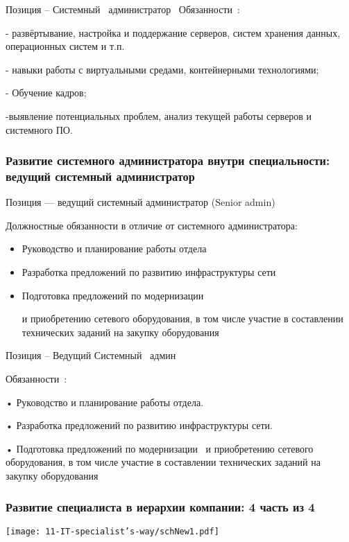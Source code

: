 \documentclass{../industrial-development}
\begin{document}
\lecturenotes

Позиция – Системный~\cite{hh} администратор~\cite{itcf}
Обязанности~\cite{rab}:

- развёртывание, настройка и поддержание серверов, систем хранения данных, операционных систем и т.п.

- навыки работы с виртуальными средами, контейнерными технологиями;

- Обучение кадров;

-выявление потенциальных проблем, анализ текущей работы серверов и системного ПО.

\begin{frame} \frametitle{Развитие системного администратора внутри специальности: ведущий системный администратор }
 \begin{block}{}
  \alert{Позиция --- ведущий системный администратор (Senior admin)}

Должностные обязанности в отличие от  системного администратора: 
  \end{block}
  \begin{itemize}
  \item   Руководство и планирование работы отдела
  \item  Разработка предложений по развитию инфраструктуры сети
  \item Подготовка предложений по модернизации 

и приобретению сетевого оборудования, в том числе участие в составлении технических заданий на закупку оборудования
  \end{itemize}
\end{frame}

\lecturenotes

Позиция – Ведущий Системный~\cite{hh} админ~\cite{itcf}

Обязанности~\cite{rab}:

•	Руководство и планирование работы отдела.

•	Разработка предложений по развитию инфраструктуры сети.

•	Подготовка предложений по модернизации ~и приобретению сетевого оборудования, в том числе участие в составлении технических заданий на закупку оборудования



\begin{frame} \frametitle{Развитие  специалиста в иерархии компании: 4 часть из 4 }
  \centerline{\texttt{[image: 11-IT-specialist's-way/schNew1.pdf]}}
\end{frame}
\end{document}
